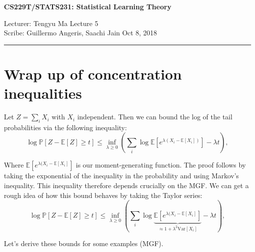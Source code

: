 \documentclass[11pt]{article}
\newcommand{\draftnotice}{\vbox to 0.25in{\noindent
   \raisebox{0.6in}[0in][0in]{\makebox[\textwidth][r]{\it
    DRAFT --- a final version will be posted shortly}}}
   \vspace{-.25in}\vspace{-\baselineskip}
}
\newcommand{\var}[1]{\mathrm{Var}\left[{#1}\right]}
\newcommand{\ex}[1]{\mathbb{E}\left[{#1}\right]}
\newcommand{\pp}[1]{\mathbb{P}\left[{#1}\right]}
\begin{document}
\thispagestyle{empty}


\begin{center}
\bf\large CS229T/STATS231: Statistical Learning Theory
\end{center}

\noindent
Lecturer: Tengyu Ma   %
\hfill
Lecture 5               %
\\
Scribe: Guillermo Angeris, Saachi Jain                  %
\hfill
Oct 8, 2018           %

\noindent
\rule{\textwidth}{1pt}

\medskip


\section{Wrap up of concentration inequalities}

Let $Z = \sum_i X_i$ with $X_i$ independent. Then we can bound the log of the tail probabilities via the following inequality:
\begin{equation}\label{eq:equation1}
  \log \pp{Z - \ex{Z} \ge t} \le \inf_{\lambda \ge 0} \left(\sum_i \log \ex{e^{\lambda(X_i - \ex{X_i})}} - \lambda t\right),
\end{equation}

Where $\ex{e^{\lambda(X_i - \ex{X_i}}}$ is our moment-generating function. The proof follows by taking the exponential of the inequality in the probability and using Markov's inequality. This inequality therefore depends crucially on the MGF. We can get a rough idea of how this bound behaves by taking the Taylor series:
\[
  \log \pp{Z - \ex{Z} \ge t} \le \inf_{\lambda \ge 0} \left(\sum_i \log \underbrace{\ex{e^{\lambda(X_i - \ex{X_i}}}}_{\approx 1 + \lambda^2 \var{X_i}} - \lambda t\right),
\]

Let's derive these bounds for some examples (MGF).
\end{document}
